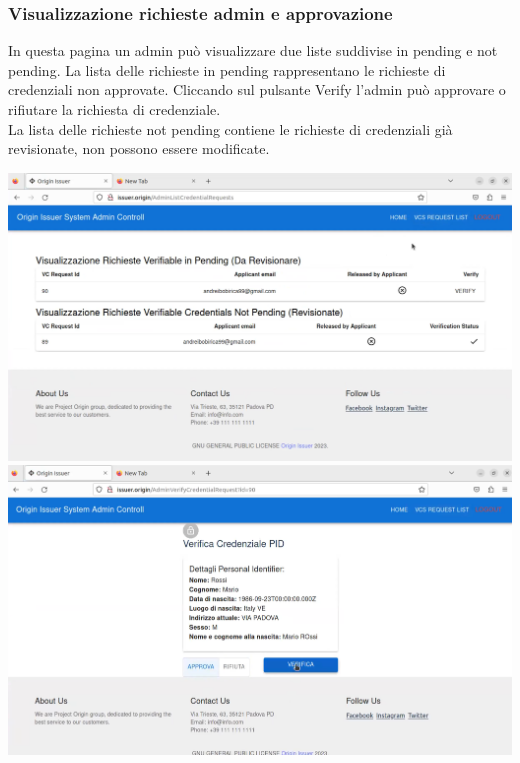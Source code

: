 \subsubsection{Visualizzazione richieste admin e approvazione} 
In questa pagina un admin può visualizzare due liste suddivise in pending e not pending. La lista delle richieste in pending rappresentano le richieste di credenziali non approvate. Cliccando sul pulsante Verify l'admin può approvare o rifiutare la richiesta di credenziale.\\
La lista delle richieste not pending contiene le richieste di credenziali già revisionate, non possono essere modificate.
\begin{center}
    \includegraphics[scale = 0.2]{./res/img/issuer/new/listaadmin1.png}
    \includegraphics[scale = 0.2]{./res/img/issuer/new/listaadmin2.png}
\end{center}


\clearpage